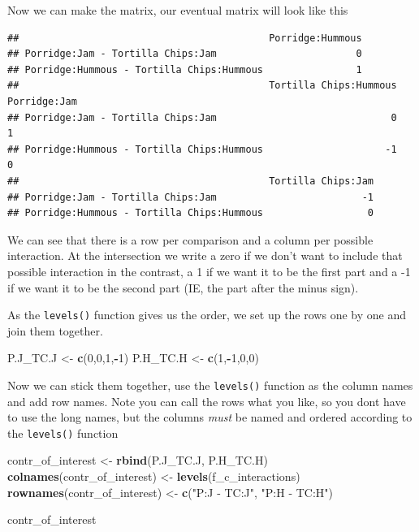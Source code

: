 \documentclass[
]{book}
\newenvironment{Shaded}{\begin{snugshade}}{\end{snugshade}}
\newcommand{\DecValTok}[1]{\textcolor[rgb]{0.00,0.00,0.81}{#1}}
\newcommand{\KeywordTok}[1]{\textcolor[rgb]{0.13,0.29,0.53}{\textbf{#1}}}
\newcommand{\NormalTok}[1]{#1}
\newcommand{\OperatorTok}[1]{\textcolor[rgb]{0.81,0.36,0.00}{\textbf{#1}}}
\newcommand{\StringTok}[1]{\textcolor[rgb]{0.31,0.60,0.02}{#1}}
\begin{document}
Now we can make the matrix, our eventual matrix will look like this

\begin{verbatim}
##                                           Porridge:Hummous
## Porridge:Jam - Tortilla Chips:Jam                        0
## Porridge:Hummous - Tortilla Chips:Hummous                1
##                                           Tortilla Chips:Hummous Porridge:Jam
## Porridge:Jam - Tortilla Chips:Jam                              0            1
## Porridge:Hummous - Tortilla Chips:Hummous                     -1            0
##                                           Tortilla Chips:Jam
## Porridge:Jam - Tortilla Chips:Jam                         -1
## Porridge:Hummous - Tortilla Chips:Hummous                  0
\end{verbatim}

We can see that there is a row per comparison and a column per possible interaction. At the intersection we write a zero if we don't want to include that possible interaction in the contrast, a 1 if we want it to be the first part and a -1 if we want it to be the second part (IE, the part after the minus sign).

As the \texttt{levels()} function gives us the order, we set up the rows one by one and join them together.

\begin{Shaded}
\begin{Highlighting}[]
\NormalTok{P.J_TC.J <-}\StringTok{ }\KeywordTok{c}\NormalTok{(}\DecValTok{0}\NormalTok{,}\DecValTok{0}\NormalTok{,}\DecValTok{1}\NormalTok{,}\OperatorTok{-}\DecValTok{1}\NormalTok{)}
\NormalTok{P.H_TC.H <-}\StringTok{ }\KeywordTok{c}\NormalTok{(}\DecValTok{1}\NormalTok{,}\OperatorTok{-}\DecValTok{1}\NormalTok{,}\DecValTok{0}\NormalTok{,}\DecValTok{0}\NormalTok{)}
\end{Highlighting}
\end{Shaded}

Now we can stick them together, use the \texttt{levels()} function as the column names and add row names. Note you can call the rows what you like, so you dont have to use the long names, but the columns \emph{must} be named and ordered according to the \texttt{levels()} function

\begin{Shaded}
\begin{Highlighting}[]
\NormalTok{contr_of_interest <-}\StringTok{ }\KeywordTok{rbind}\NormalTok{(P.J_TC.J, P.H_TC.H)}
\KeywordTok{colnames}\NormalTok{(contr_of_interest) <-}\StringTok{ }\KeywordTok{levels}\NormalTok{(f_c_interactions)}
\KeywordTok{rownames}\NormalTok{(contr_of_interest) <-}\StringTok{ }\KeywordTok{c}\NormalTok{(}\StringTok{"P:J - TC:J"}\NormalTok{,}
          \StringTok{"P:H - TC:H"}\NormalTok{)}

\NormalTok{contr_of_interest}
\end{Highlighting}
\end{Shaded}
\end{document}
